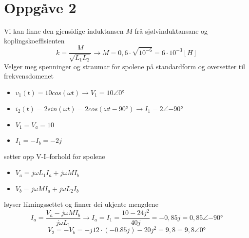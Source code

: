 \documentclass[12pt,a4paper]{article}
\begin{document}
  \section*{Oppgåve 2}
    Vi kan finne den gjensidige induktansen $M$ frå sjølvinduktansane og koplingskoeffisienten
    \begin{equation}
      k = \frac{M}{\sqrt{L_1L_2}} \rightarrow M = 0,6 \cdot \sqrt{10^{-6}} = 6\cdot 10^{-3}[H]
    \end{equation}
    Velger meg spenninger og straumar for spolene på standardform og oversetter til
    frekvensdomenet
    \begin{itemize}
      \item $v_1(t) = 10cos(\omega t) \rightarrow V_1 = 10\angle \ang{0}$
      \item $i_2(t) = 2sin(\omega t) = 2cos(\omega t - \ang{90})
        \rightarrow I_1 = 2\angle \ang{-90}$
      \item $V_1 = V_a = 10$
      \item $I_1 = -I_b = -2j$
    \end{itemize}
    setter opp V-I--forhold for spolene
    \begin{itemize}
      \item $V_a = j\omega L_1I_a + j\omega MI_b$
      \item $V_b = j\omega MI_a + j\omega L_2I_b$
    \end{itemize}
    løyser likningssettet og finner dei ukjente mengdene
    \begin{equation}
      I_a = \frac{V_a - j\omega MI_b}{j\omega L_1}
      \rightarrow I_a = I_1 = \frac{10-24j^2}{40j} = -0,85j = 0,85\angle \ang{-90}
    \end{equation}
    \begin{equation}
      V_2 = -V_b = -j12\cdot(-0.85j) - 20j^2 = 9,8 = 9,8\angle\ang{0}
    \end{equation}
\end{document}
